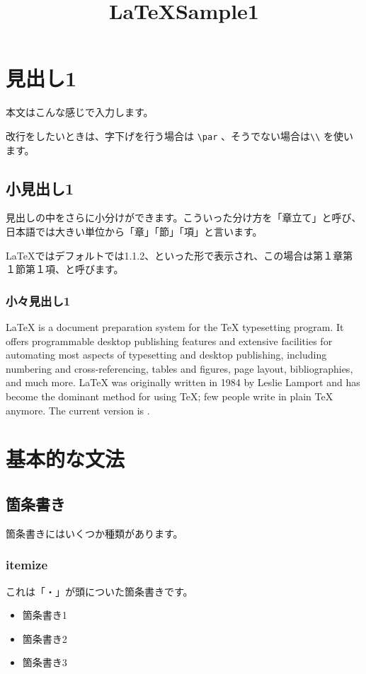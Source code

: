 \documentclass[12pt, b5paper]{ltjsarticle}
\title{ \LaTeX Sample1 }
\begin{document}
    \maketitle

    \section{見出し1}
        本文はこんな感じで入力します。\par
        改行をしたいときは、字下げを行う場合は \verb+\par+ 、そうでない場合は\verb+\\+ を使います。
        \subsection{小見出し1}
            見出しの中をさらに小分けができます。こういった分け方を「章立て」と呼び、日本語では大きい単位から「章」「節」「項」と言います。\par
            \LaTeX ではデフォルトでは1.1.2、といった形で表示され、この場合は第１章第１節第１項、と呼びます。
            \subsubsection{小々見出し1}
            \LaTeX{} is a document preparation system for the \TeX{} typesetting program. It offers programmable desktop publishing features and extensive facilities for automating most aspects of typesetting and desktop publishing, including numbering and cross-referencing, tables and figures, page layout, bibliographies, and much more. \LaTeX{} was originally written in 1984 by Leslie Lamport and has become the dominant method for using \TeX; few people write in plain \TeX{} anymore. The current version is \LaTeXe.
    \section{基本的な文法}
        \subsection{箇条書き}
            箇条書きにはいくつか種類があります。
            \subsubsection{itemize}
                これは「・」が頭についた箇条書きです。
                \begin{itemize}
                    \item 箇条書き1
                    \item 箇条書き2
                    \item 箇条書き3
                \end{itemize}
\end{document}

